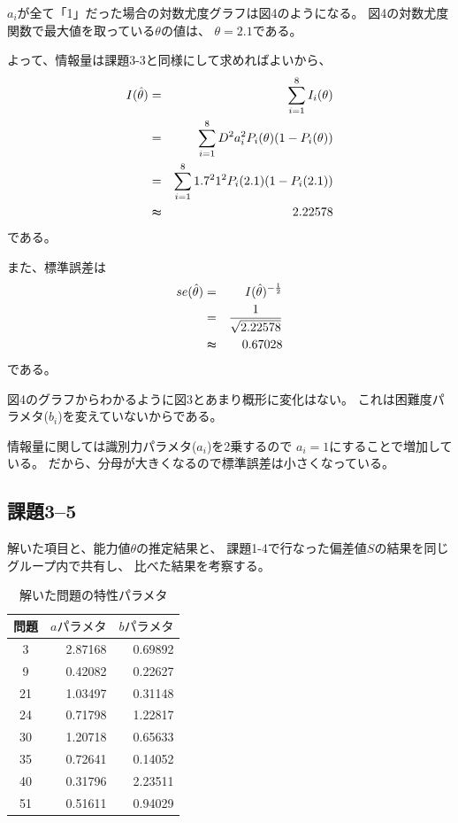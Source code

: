 \documentclass[12pt]{jarticle}
\begin{document}
$a_i$が全て「1」だった場合の対数尤度グラフは図4のようになる。
図4の対数尤度関数で最大値を取っている$\theta$の値は、
$\theta=2.1$である。

よって、情報量は課題3-3と同様にして求めればよいから、
\begin{eqnarray*}
    I(\hat{\theta})&=&\sum_{i=1}^{8}{I_i({\theta})}\\
    &=&\sum_{i=1}^{8}{D^2a_i^2P_i(\theta)(1-P_i(\theta))}\\
    &=&\sum_{i=1}^{8}{1.7^2 1^2P_i(2.1)(1-P_i(2.1))}\\
    &\thickapprox & 2.22578
\end{eqnarray*}
である。

また、標準誤差は
\begin{eqnarray*}
    se(\hat{\theta})&=&I(\hat{\theta})^{-\frac{1}{2}}\\
    &= &\frac{1}{\sqrt{2.22578}}\\
    &\thickapprox& 0.67028
\end{eqnarray*}
である。

図4のグラフからわかるように図3とあまり概形に変化はない。
これは困難度パラメタ($b_i$)を変えていないからである。

情報量に関しては識別力パラメタ($a_i$)を2乗するので
$a_i=1$にすることで増加している。
だから、分母が大きくなるので標準誤差は小さくなっている。

\subsection{課題3–5}
\begin{shadebox}
    解いた項目と、能力値$\theta$の推定結果と、
    課題1-4で行なった偏差値$S$の結果を同じグループ内で共有し、
    比べた結果を考察する。
\end{shadebox}


\begin{table}[htb]
    \begin{center}
        \caption{解いた問題の特性パラメタ}
        \begin{tabular}{|c|r|r|}
            \hline
            問題 & $aパラメタ$ & $bパラメタ$ \\
            \hline
            3    & 2.87168     & 0.69892     \\
            9    & 0.42082     & 0.22627     \\
            21   & 1.03497     & 0.31148     \\
            24   & 0.71798     & 1.22817     \\
            30   & 1.20718     & 0.65633     \\
            35   & 0.72641     & 0.14052     \\
            40   & 0.31796     & 2.23511     \\
            51   & 0.51611     & 0.94029     \\
            \hline
        \end{tabular}
    \end{center}
\end{table}
\end{document}
